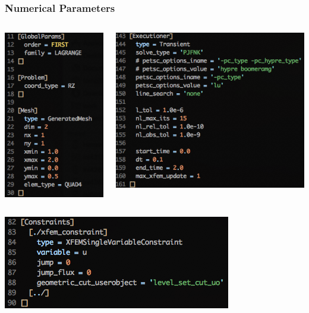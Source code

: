 \documentclass[]{beamer}
\begin{document}
\begin{frame}\frametitle{Numerical Parameters}
  	\begin{columns}
			\begin{center}
			\includegraphics[scale=0.4]{figures/Screen-GlobalParams-1Drzh1m}
			\end{center}
			\begin{center}
			\includegraphics[scale=0.4]{figures/Screen-Executioner-1Drzh1m}
			\end{center}
	\end{columns}
	\begin{center}
	\includegraphics[scale=0.4]{figures/Screen-Constraints-1Drzh1m}
	\end{center}
\end{frame}
\end{document}
